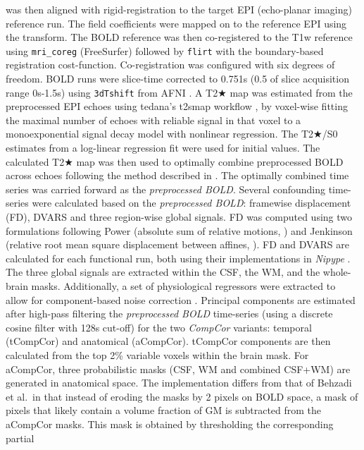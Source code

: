 \documentclass[
]{article}
\begin{document}
\begin{description}
was then aligned with rigid-registration to the target EPI (echo-planar
imaging) reference run. The field coefficients were mapped on to the
reference EPI using the transform. The BOLD reference was then
co-registered to the T1w reference using \texttt{mri\_coreg}
(FreeSurfer) followed by \texttt{flirt} \citep[FSL ,][]{flirt} with the
boundary-based registration \citep{bbr} cost-function. Co-registration
was configured with six degrees of freedom. BOLD runs were slice-time
corrected to 0.751s (0.5 of slice acquisition range 0s-1.5s) using
\texttt{3dTshift} from AFNI \citep[RRID:SCR\_005927]{afni}. A T2★ map
was estimated from the preprocessed EPI echoes using tedana's t2smap
workflow \citep{DuPre2021}, by voxel-wise fitting the maximal number of
echoes with reliable signal in that voxel to a monoexponential signal
decay model with nonlinear regression. The T2★/S0 estimates from a
log-linear regression fit were used for initial values. The calculated
T2★ map was then used to optimally combine preprocessed BOLD across
echoes following the method described in \citep{posse_t2s}. The
optimally combined time series was carried forward as the
\emph{preprocessed BOLD}. Several confounding time-series were
calculated based on the \emph{preprocessed BOLD}: framewise displacement
(FD), DVARS and three region-wise global signals. FD was computed using
two formulations following Power (absolute sum of relative motions,
\citet{power_fd_dvars}) and Jenkinson (relative root mean square
displacement between affines, \citet{mcflirt}). FD and DVARS are
calculated for each functional run, both using their implementations in
\emph{Nipype} \citep[following the definitions by][]{power_fd_dvars}.
The three global signals are extracted within the CSF, the WM, and the
whole-brain masks. Additionally, a set of physiological regressors were
extracted to allow for component-based noise correction
\citep[\emph{CompCor},][]{compcor}. Principal components are estimated
after high-pass filtering the \emph{preprocessed BOLD} time-series
(using a discrete cosine filter with 128s cut-off) for the two
\emph{CompCor} variants: temporal (tCompCor) and anatomical (aCompCor).
tCompCor components are then calculated from the top 2\% variable voxels
within the brain mask. For aCompCor, three probabilistic masks (CSF, WM
and combined CSF+WM) are generated in anatomical space. The
implementation differs from that of Behzadi et al.~in that instead of
eroding the masks by 2 pixels on BOLD space, a mask of pixels that
likely contain a volume fraction of GM is subtracted from the aCompCor
masks. This mask is obtained by thresholding the corresponding partial

\end{description}
\end{document}
